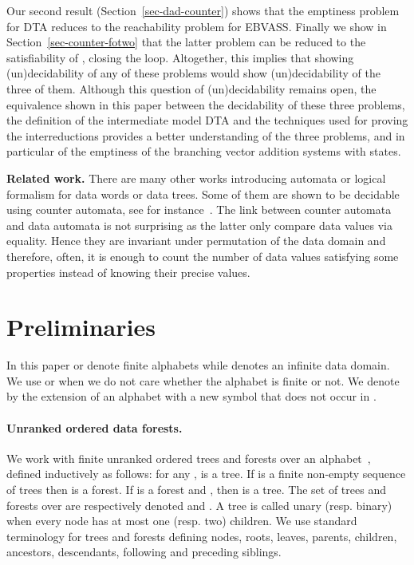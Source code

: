 \documentclass{CSML}
\newcommand\ebvass{\textup{EBVASS}\xspace}
\newcommand\dad{\textup{DTA}\xspace}
\begin{document}
Our second result (Section~\ref{sec-dad-counter}) shows that the emptiness
problem for \dad reduces to the reachability problem for \ebvass.  Finally we
show in Section~\ref{sec-counter-fotwo} that the latter problem can be reduced
to the satisfiability of \fotwo, closing the loop.  Altogether, this implies
that showing (un)decidability of any of these problems would show
(un)decidability of the three of them.
Although this question of (un)decidability remains open,
the equivalence shown in this paper between the decidability of these three problems,
the definition of the intermediate model \dad and the techniques used for proving
the interreductions provides
a better understanding of the three problems, 
and in particular of the emptiness of the branching vector addition systems with states.

{\bf Related work.}
There are many other works introducing automata or logical formalism for data
words or data trees. Some of them are shown to be decidable using counter automata,
see for instance~\cite{DL-tocl08,JL08}. The link between counter automata and
data automata is not surprising as the latter
only compare data values via equality. 
Hence they are invariant under permutation of the data domain and therefore, 
often, it is enough
to count the number of data values satisfying some properties instead of
knowing their precise values.



\section{Preliminaries}\label{sec:prelim}

In this paper  or  denote finite alphabets while  denotes an infinite
data domain. We use  or  when we do not care whether the alphabet is
finite or not. We denote by  the extension of an alphabet  with a new symbol 
that does not occur in .


\paragraph{Unranked ordered data forests.}
We work with finite unranked ordered trees and forests over an alphabet~,
defined inductively as follows: for any ,  is a tree. If
 is a finite non-empty sequence of trees then 
 is a forest. If  is a forest and , then
 is a tree. The set of trees and forests over  are respectively
denoted  and .  A tree is called unary
(resp. binary) when every node has at most one (resp. two) children.
We use standard terminology for trees and forests defining nodes, roots,
leaves, parents, children, ancestors, descendants, following 
and preceding siblings.
\end{document}
